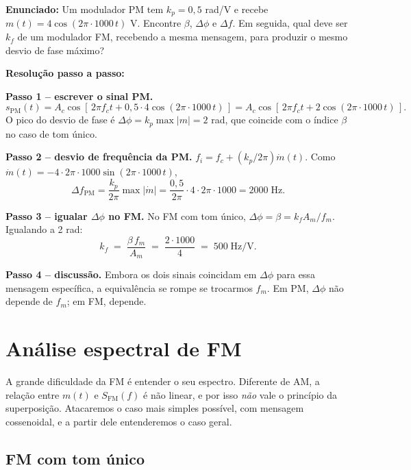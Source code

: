 \documentclass[11pt,a4paper]{article}
\newcommand{\FM}{\text{FM}}
\newcommand{\PM}{\text{PM}}
\begin{document}
\begin{exercicio}
\textbf{Enunciado:} Um modulador PM tem $k_p=0{,}5$ rad/V e recebe $m(t)=4\cos(2\pi\!\cdot\!1000\,t)$ V. Encontre $\beta$, $\Delta\phi$ e $\Delta f$. Em seguida, qual deve ser $k_f$ de um modulador FM, recebendo a mesma mensagem, para produzir o mesmo desvio de fase máximo?

\textbf{Resolução passo a passo:}

\textbf{Passo 1 -- escrever o sinal PM.}
\[
  s_{\PM}(t) = A_c\cos[\,2\pi f_c t + 0{,}5\!\cdot\!4\cos(2\pi\!\cdot\!1000\,t)\,] = A_c\cos[\,2\pi f_c t + 2\cos(2\pi\!\cdot\!1000\,t)\,].
\]
O pico do desvio de fase é $\Delta\phi = k_p\max|m|=2$ rad, que coincide com o índice $\beta$ no caso de tom único.

\textbf{Passo 2 -- desvio de frequência da PM.}
$f_i = f_c + (k_p/2\pi)\dot m(t)$. Como $\dot m(t)=-4\cdot 2\pi\!\cdot\!1000\sin(2\pi\!\cdot\!1000\,t)$,
\[
  \Delta f_{\PM} = \frac{k_p}{2\pi}\max|\dot m| = \frac{0{,}5}{2\pi}\cdot 4\cdot 2\pi\!\cdot\!1000 = 2000\;\text{Hz}.
\]

\textbf{Passo 3 -- igualar $\Delta\phi$ no FM.}
No FM com tom único, $\Delta\phi=\beta=k_f A_m/f_m$. Igualando a 2 rad:
\[
  k_f \;=\; \frac{\beta\, f_m}{A_m} \;=\; \frac{2\cdot 1000}{4} \;=\; 500\;\text{Hz/V}.
\]

\textbf{Passo 4 -- discussão.}
Embora os dois sinais coincidam em $\Delta\phi$ para essa mensagem específica, a equivalência se rompe se trocarmos $f_m$. Em PM, $\Delta\phi$ não depende de $f_m$; em FM, depende.
\end{exercicio}

\section{Análise espectral de FM}

A grande dificuldade da FM é entender o seu espectro. Diferente de AM, a relação entre $m(t)$ e $S_{\FM}(f)$ é não linear, e por isso \emph{não} vale o princípio da superposição. Atacaremos o caso mais simples possível, com mensagem cossenoidal, e a partir dele entenderemos o caso geral.

\subsection{FM com tom único}
\end{document}
